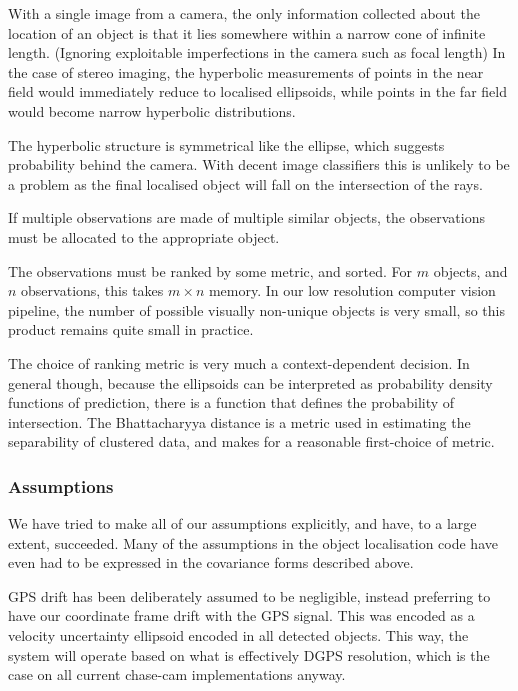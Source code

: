 \documentclass{article}
\newcounter{subsubsubsection}[subsubsection]
\begin{document}
        With a single image from a camera, the only information collected about the location of an object is that it lies somewhere within a narrow cone of infinite length.  (Ignoring exploitable imperfections in the camera such as focal length)
        In the case of stereo imaging, the hyperbolic measurements of points in the near field would immediately reduce to localised ellipsoids, while points in the far field would become narrow hyperbolic distributions.

        The hyperbolic structure is symmetrical like the ellipse, which suggests probability behind the camera.  With decent image classifiers this is unlikely to be a problem as the final localised object will fall on the intersection of the rays.

        If multiple observations are made of multiple similar objects, the observations must be allocated to the appropriate object.

        The observations must be ranked by some metric, and sorted.  For \(m\) objects, and \(n\) observations, this takes \(m \times n\) memory.  In our low resolution computer vision pipeline, the number of possible visually non-unique objects is very small, so this product remains quite small in practice.

        The choice of ranking metric is very much a context-dependent decision.  In general though, because the ellipsoids can be interpreted as probability density functions of prediction, there is a function that defines the probability of intersection. The Bhattacharyya distance is a metric used in estimating the separability of clustered data, and makes for a reasonable first-choice of metric.

    \subsubsection{Assumptions}
      We have tried to make all of our assumptions explicitly, and have, to a large extent, succeeded.
      Many of the assumptions in the object localisation code have even had to be expressed in the covariance forms described above.

      GPS drift has been deliberately assumed to be negligible, instead preferring to have our coordinate frame drift with the GPS signal.  This was encoded as a velocity uncertainty ellipsoid encoded in all detected objects.
      This way, the system will operate based on what is effectively DGPS resolution, which is the case on all current chase-cam implementations anyway.
\end{document}
